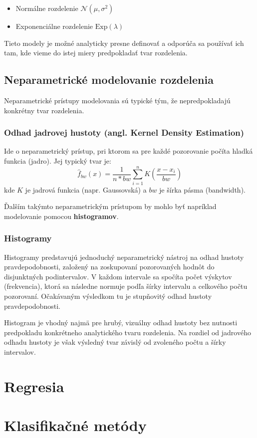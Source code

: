 \begin{itemize}
  \item Normálne rozdelenie $\mathcal{N}(\mu, \sigma^2)$
  \item Exponenciálne rozdelenie $\text{Exp}(\lambda)$
\end{itemize}

Tieto modely je možné analyticky presne definovať a odporúča sa používať ich tam, kde vieme do istej miery predpokladať tvar rozdelenia.

\subsection{Neparametrické modelovanie rozdelenia}

Neparametrické prístupy modelovania sú typické tým, že nepredpokladajú konkrétny tvar rozdelenia.

\subsubsection{Odhad jadrovej hustoty (angl. Kernel Density Estimation)}

Ide o neparametrický prístup, pri ktorom sa pre každé pozorovanie počíta hladká funkcia (jadro). Jej typický tvar je:
\[
\hat{f}_{bw}(x) = \frac{1}{n*bw} \sum_{i=1}^n K\left( \frac{x - x_i}{bw} \right)
\]
kde $K$ je jadrová funkcia (napr. Gaussovská) a $bw$ je šírka pásma (bandwidth).

Ďalším takýmto neparametrickým prístupom by mohlo byť napríklad modelovanie pomocou \textbf{histogramov}. 

\subsubsection{Histogramy}

Histogramy predstavujú jednoduchý neparametrický nástroj na odhad hustoty pravdepodobnosti, založený na zoskupovaní pozorovaných hodnôt do disjunktných podintervalov. V každom intervale sa spočíta počet výskytov (frekvencia), ktorá sa následne normuje podľa šírky intervalu a celkového počtu pozorovaní. Očakávaným výsledkom tu je stupňovitý odhad hustoty pravdepodobnosti.

Histogram je vhodný najmä pre hrubý, vizuálny odhad hustoty bez nutnosti predpokladu konkrétneho analytického tvaru rozdelenia. Na rozdiel od jadrového odhadu hustoty je však výsledný tvar závislý od zvoleného počtu a šírky intervalov.

\section{Regresia}\label{sec:regresia}

\section{Klasifikačné metódy}\label{sec:klas_metody}